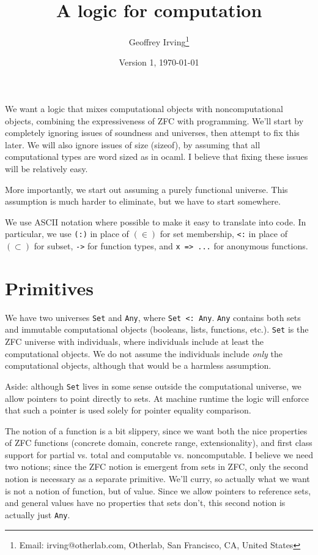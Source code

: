 \documentclass[11pt]{article}
\title{A logic for computation}
\author{Geoffrey Irving\thanks{Email: irving@otherlab.com, Otherlab, San Francisco, CA, United States}}
\date{Version 1, \today}
\newcommand{\cc}[1]{\texttt{#1}}
\begin{document}
\maketitle

We want a logic that mixes computational objects with noncomputational objects, combining the
expressiveness of ZFC with programming.  We'll start by completely ignoring issues of soundness
and universes, then attempt to fix this later.  We will also ignore issues of size (sizeof),
by assuming that all computational types are word sized as in ocaml.  I believe that fixing
these issues will be relatively easy.

More importantly, we start out assuming a purely functional universe.  This assumption is much
harder to eliminate, but we have to start somewhere.

We use ASCII notation where possible to make it easy to translate into code.  In particular,
we use \cc{(:)} in place of $(\in)$ for set membership, \cc{<:} in place of $(\subset)$ for subset,
\cc{->} for function types, and \cc{x => ...} for anonymous functions.

\section{Primitives}

We have two universes \cc{Set} and \cc{Any}, where \cc{Set <: Any}.  \cc{Any} contains both sets
and immutable computational objects (booleans, lists, functions, etc.).  \cc{Set} is the ZFC
universe with individuals, where individuals include at least the computational objects.  We do
not assume the individuals include \emph{only} the computational objects, although that would
be a harmless assumption.

Aside: although \cc{Set} lives in some sense outside the computational universe, we allow
pointers to point directly to sets.  At machine runtime the logic will enforce that such a
pointer is used solely for pointer equality comparison.

The notion of a function is a bit slippery, since we want both the nice properties of ZFC
functions (concrete domain, concrete range, extensionality), and first class support for
partial vs. total and computable vs. noncomputable.  I believe we need two notions; since
the ZFC notion is emergent from sets in ZFC, only the second notion is necessary as a
separate primitive.  We'll curry, so actually what we want is not a notion of function, but
of value.  Since we allow pointers to reference sets, and general values have no properties
that sets don't, this second notion is actually just \cc{Any}.
\end{document}

